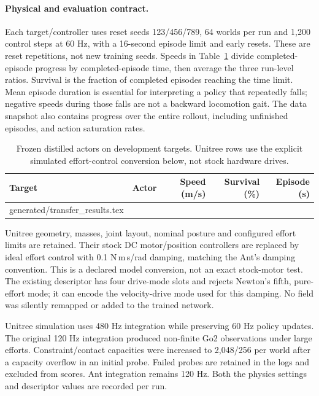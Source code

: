 \documentclass[11pt,letterpaper]{article}
\makeatletter
\newcommand{\tableinput}[1]{\@@input #1 }
\makeatother
\begin{document}
\paragraph{Physical and evaluation contract.}
Each target/controller uses reset seeds 123/456/789, 64 worlds per run and
1,200 control steps at 60 Hz, with a 16-second episode limit and early resets.
These are reset repetitions, not new training seeds. Speeds in
Table~\ref{tab:transfer} divide completed-episode progress by completed-episode
time, then average the three run-level ratios. Survival is the fraction of
completed episodes reaching the time limit. Mean episode duration is essential
for interpreting a policy that repeatedly falls; negative speeds during those
falls are not a backward locomotion gait. The data snapshot also contains
progress over the entire rollout, including unfinished episodes, and action
saturation rates.

\begin{table}[htbp]
\centering\small
\begin{tabular}{@{}llrrr@{}}
\toprule
Target & Actor & Speed (m/s) & Survival (\%) & Episode (s)\\
\midrule
\tableinput{generated/transfer_results.tex}
\bottomrule
\end{tabular}
\caption{Frozen distilled actors on development targets. Unitree rows use the
explicit simulated effort-control conversion below, not stock hardware drives.}
\label{tab:transfer}
\end{table}

Unitree geometry, masses, joint layout, nominal posture and configured effort
limits are retained. Their stock DC motor/position controllers are replaced by
ideal effort control with 0.1 N\,m\,s/rad damping, matching the Ant's damping
convention. This is a declared model conversion, not an exact stock-motor test.
The existing descriptor has four drive-mode slots and rejects Newton's fifth,
pure-effort mode; it can encode the velocity-drive mode used for this damping.
No field was silently remapped or added to the trained network.

Unitree simulation uses 480 Hz integration while preserving 60 Hz policy
updates. The original 120 Hz integration produced non-finite Go2 observations
under large efforts. Constraint/contact capacities were increased to
2,048/256 per world after a capacity overflow in an initial probe. Failed probes
are retained in the logs and excluded from scores. Ant integration remains
120 Hz. Both the physics settings and descriptor values are recorded per run.
\end{document}
